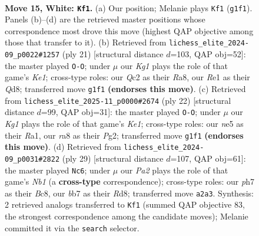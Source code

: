 \documentclass[11pt]{article}
\begin{document}
\clearpage

\begin{figure}[p]\centering
\begin{subfigure}{0.46\textwidth}\centering
\resizebox{\linewidth}{!}{%
\newchessgame
\chessboard[
  setfen={r2q4/1bp2kpp/1b1p1n2/pp2n3/4P3/2P5/PPQ2PPP/RNB1R1K1 w - - 0 15},
  showmover=false,
  pgfstyle=straightmove, color=movearrow, markmove={g1-f1}
]}
\caption{}
\end{subfigure}\hfill
\begin{subfigure}{0.46\textwidth}\centering
\resizebox{\linewidth}{!}{%
\newchessgame
\chessboard[
  setfen={r1bqk2r/5pbp/p1np1p2/1p1Np3/4P3/N2B4/PPP2PPP/R2QK2R b KQkq - 3 11},
  showmover=false,
  pgfstyle=straightmove, color=movearrow, markmove={e8-g8}
]}
\caption{}
\end{subfigure}
\\[4pt]
\begin{subfigure}{0.46\textwidth}\centering
\resizebox{\linewidth}{!}{%
\newchessgame
\chessboard[
  setfen={r1bq1rk1/ppp2ppp/5n2/4b3/2B1P3/2N5/PPQ2PPP/R1B1K2R w KQ - 0 12},
  showmover=false,
  pgfstyle=straightmove, color=movearrow, markmove={e1-g1}
]}
\caption{}
\end{subfigure}\hfill
\begin{subfigure}{0.46\textwidth}\centering
\resizebox{\linewidth}{!}{%
\newchessgame
\chessboard[
  setfen={rnbr2k1/pp2qpp1/4p2p/8/2BP4/1QN4P/PP3PP1/2RR2K1 b - - 0 15},
  showmover=false,
  pgfstyle=straightmove, color=movearrow, markmove={b8-c6}
]}
\caption{}
\end{subfigure}
\caption{\textbf{Move 15, White: \texttt{Kf1}.} (a) Our position; Melanie plays \texttt{Kf1} (\texttt{g1f1}). Panels (b)--(d) are the retrieved master positions whose correspondence most drove this move (highest QAP objective among those that transfer to it). (b) Retrieved from \texttt{lichess\_elite\_2024-09\_p0022\#1257} (ply 21) [structural distance $d$=103, QAP obj=52]: the master played \texttt{O-O}; under $\mu$ our \emph{Kg1} plays the role of that game's \emph{Ke1}; cross-type roles: our \emph{Q}c2 as their \emph{R}a8, our \emph{R}e1 as their \emph{Q}d8; transferred move \texttt{g1f1} \textbf{(endorses this move)}. (c) Retrieved from \texttt{lichess\_elite\_2025-11\_p0000\#2674} (ply 22) [structural distance $d$=99, QAP obj=31]: the master played \texttt{O-O}; under $\mu$ our \emph{Kg1} plays the role of that game's \emph{Ke1}; cross-type roles: our \emph{n}e5 as their \emph{R}a1, our \emph{r}a8 as their \emph{P}g2; transferred move \texttt{g1f1} \textbf{(endorses this move)}. (d) Retrieved from \texttt{lichess\_elite\_2024-09\_p0031\#2822} (ply 29) [structural distance $d$=107, QAP obj=61]: the master played \texttt{Nc6}; under $\mu$ our \emph{Pa2} plays the role of that game's \emph{Nb1} (a \textbf{cross-type} correspondence); cross-type roles: our \emph{p}h7 as their \emph{B}c8, our \emph{b}b7 as their \emph{R}d8; transferred move \texttt{a2a3}. Synthesis: 2 retrieved analogs transferred to \texttt{Kf1} (summed QAP objective 83, the strongest correspondence among the candidate moves); Melanie committed it via the \texttt{search} selector.}
\label{fig:thought-m28}
\end{figure}
\end{document}

